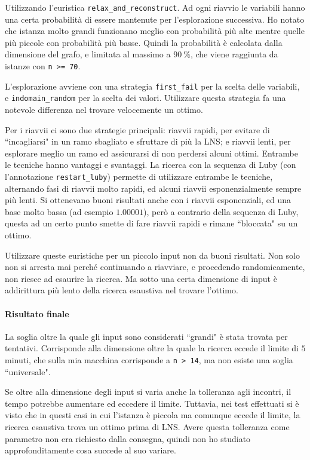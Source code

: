 \documentclass[11pt, a4paper]{article}
\begin{document}
Utilizzando l'euristica \lstinline{relax_and_reconstruct}. Ad ogni riavvio le variabili hanno una certa probabilità di essere mantenute per l'esplorazione successiva.
Ho notato che istanza molto grandi funzionano meglio con probabilità più alte mentre quelle più piccole con probabilità più basse. Quindi la probabilità è calcolata dalla dimensione del grafo, e limitata al massimo a $\qty{90}{\percent}$, che viene raggiunta da istanze con \lstinline{n >= 70}.

L'esplorazione avviene con una strategia \lstinline{first_fail} per la scelta delle variabili, e \lstinline{indomain_random} per la scelta dei valori.
Utilizzare questa strategia fa una notevole differenza nel trovare velocemente un ottimo.

Per i riavvii ci sono due strategie principali: riavvii rapidi, per evitare di ``incagliarsi" in un ramo sbagliato e sfruttare di più la LNS; e riavvii lenti, per esplorare meglio un ramo ed assicurarsi di non perdersi alcuni ottimi. Entrambe le tecniche hanno vantaggi e svantaggi.
La ricerca con la sequenza di Luby (con l'annotazione \lstinline{restart_luby}) permette di utilizzare entrambe le tecniche, alternando fasi di riavvii molto rapidi, ed alcuni riavvii esponenzialmente sempre più lenti.
Si ottenevano buoni risultati anche con i riavvii esponenziali, ed una base molto bassa (ad esempio $1.00001$), però a contrario della sequenza di Luby, questa ad un certo punto smette di fare riavvii rapidi e rimane ``bloccata" su un ottimo.

Utilizzare queste euristiche per un piccolo input non da buoni risultati. Non solo non si arresta mai perché continuando a riavviare, e procedendo randomicamente, non riesce ad esaurire la ricerca.
Ma sotto una certa dimensione di input è addirittura più lento della ricerca esaustiva nel trovare l'ottimo.

\paragraph{Risultato finale}
La soglia oltre la quale gli input sono considerati ``grandi" è stata trovata per tentativi. Corrisponde alla dimensione oltre la quale la ricerca eccede il limite di $5$ minuti, che sulla mia macchina corrisponde a \lstinline{n > 14}, ma non esiste una soglia ``universale".

Se oltre alla dimensione degli input si varia anche la tolleranza agli incontri, il tempo potrebbe aumentare ed eccedere il limite. Tuttavia, nei test effettuati si è visto che in questi casi in cui l'istanza è piccola ma comunque eccede il limite, la ricerca esaustiva trova un ottimo prima di LNS.
Avere questa tolleranza come parametro non era richiesto dalla consegna, quindi non ho studiato approfonditamente cosa succede al suo variare.
\end{document}
